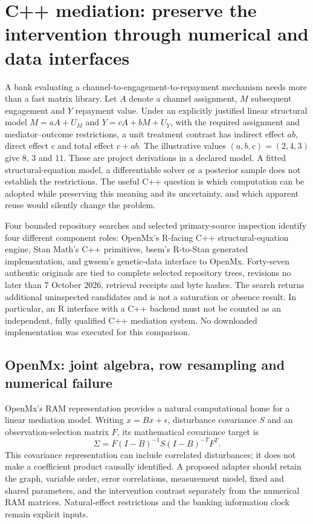 \section[C++ mediation and numerical contracts]{C++ mediation: preserve the intervention through numerical and data interfaces}
\label{sec:exec25-cmed}

A bank evaluating a channel-to-engagement-to-repayment mechanism needs more
than a fast matrix library. Let $A$ denote a channel assignment, $M$ subsequent
engagement and $Y$ repayment value. Under an explicitly justified linear
structural model $M=aA+U_M$ and $Y=cA+bM+U_Y$, with the required assignment
and mediator--outcome restrictions, a unit treatment contrast has indirect
effect $ab$, direct effect $c$ and total effect $c+ab$. The illustrative values
$(a,b,c)=(2,4,3)$ give $8$, $3$ and $11$. These are project derivations in a
declared model. A fitted structural-equation model, a differentiable solver or
a posterior sample does not establish the restrictions. The useful C++ question
is which computation can be adopted while preserving this meaning and its
uncertainty, and which apparent reuse would silently change the problem.

Four bounded repository searches and selected primary-source inspection identify
four different component roles: OpenMx's R-facing C++ structural-equation engine,
Stan Math's C++ primitives, bsem's R-to-Stan generated implementation, and gwsem's
genetic-data interface to OpenMx. Forty-seven authentic originals are tied to
complete selected repository trees, revisions no later than 7 October 2026,
retrieval receipts and byte hashes. The search returns additional uninspected
candidates and is not a saturation or absence result. In particular, an R
interface with a C++ backend must not be counted as an independent, fully
qualified C++ mediation system. No downloaded implementation was executed for
this comparison.~\citep{exec25_cmed_choice}

\subsection{OpenMx: joint algebra, row resampling and numerical failure}

OpenMx's RAM representation provides a natural computational home for a linear
mediation model. Writing $x=Bx+\epsilon$, disturbance covariance $S$ and an
observation-selection matrix $F$, its mathematical covariance target is
\[
 \Sigma=F(I-B)^{-1}S(I-B)^{-T}F^T.
\]
This covariance representation can include correlated disturbances; it does not
make a coefficient product causally identified. A proposed adapter should retain
the graph, variable order, error correlations, measurement model, fixed and
shared parameters, and the intervention contrast separately from the numerical
RAM matrices. Natural-effect restrictions and the banking information clock
remain explicit inputs.~\citep{exec25_cmed_openmx}

